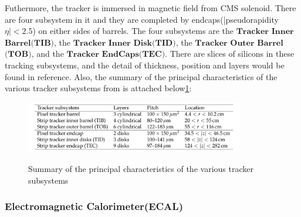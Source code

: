 			Futhermore, the tracker is immersed in magnetic field from CMS solenoid. There are four subsystem in it and they are completed by endcaps(|pseudorapidity $\eta | < 2.5$) on either sides of barrels. The four subsystems are the $\textbf{Tracker}$ $\textbf{Inner}$ $\textbf{Barrel}$$\textbf{(TIB)}$, the $\textbf{Tracker}$ $\textbf{Inner}$ $\textbf{Disk}$$\textbf{(TID)}$, the $\textbf{Tracker}$ $\textbf{Outer}$ $\textbf{Barrel}$$\textbf{(TOB)}$, and the $\textbf{Tracker}$ $\textbf{EndCaps}$$\textbf{(TEC)}$. There are slices of silicons in these tracking subsystems, and the detail of thickness, position and layers would be found in reference\cite{Chatrchyan:2014fea}. Also, the summary of the principal characteristics of the various tracker subsystems from \cite{Chatrchyan:2014fea} is attached below\ref{ExpApp:fig:tracker_sum}:
			
			\begin{figure}[H]
			\centering{}
		    	\includegraphics[width=0.85\textwidth]{Figures/ExpApparatus/summary_subtracker.png}\\
			\caption{Summary of the principal characteristics of the various tracker subsystems\cite{Chatrchyan:2014fea}}
			\label{ExpApp:fig:tracker_sum}
			\end{figure}
			\FloatBarrier

		\subsubsection{Electromagnetic Calorimeter(ECAL)}
		\label{sssec:ecal}

